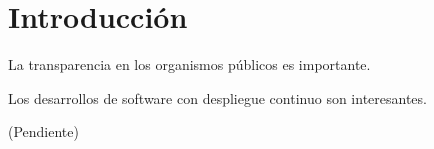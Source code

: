 \chapter{Introducción}

La transparencia en los organismos públicos es importante.

Los desarrollos de software con despliegue continuo son interesantes.

(Pendiente)